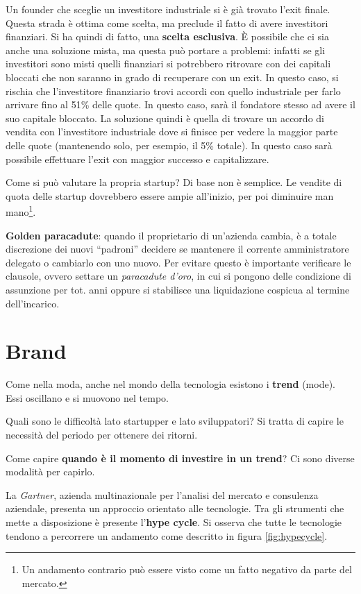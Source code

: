 Un founder che sceglie un investitore industriale si è già trovato l'exit
finale.
Questa strada è ottima come scelta, ma preclude il fatto di avere investitori
finanziari. Si ha quindi di fatto, una \textbf{scelta esclusiva}.
È possibile che ci sia anche una soluzione mista, ma questa può portare a
problemi: infatti se gli investitori sono misti quelli finanziari si potrebbero
ritrovare con dei capitali bloccati che non saranno in grado di recuperare con
un exit. In questo caso, si rischia che l'investitore finanziario trovi accordi
con quello industriale per farlo arrivare fino al 51\% delle quote. In questo
caso, sarà il fondatore stesso ad avere il suo capitale bloccato. La soluzione
quindi è quella di trovare un accordo di vendita con l'investitore industriale
dove si finisce per vedere la maggior parte delle quote (mantenendo solo, per
esempio, il 5\% totale). In questo caso sarà possibile effettuare l'exit con
maggior successo e capitalizzare.

Come si può valutare la propria startup? Di base non è semplice. Le vendite di
quota delle startup dovrebbero essere ampie all'inizio, per poi diminuire man
mano\footnote{Un andamento contrario può essere visto come un fatto negativo da
parte del mercato.}.

\textbf{Golden paracadute}: quando il proprietario di un'azienda cambia, è a
totale discrezione dei nuovi ``padroni'' decidere se mantenere il corrente
amministratore delegato o cambiarlo con uno nuovo. Per evitare questo è
importante verificare le clausole, ovvero settare un \textit{paracadute d'oro},
in cui si pongono delle condizione di assunzione per tot. anni oppure si
stabilisce una liquidazione cospicua al termine dell'incarico.

\chapter{Brand}

Come nella moda, anche nel mondo della tecnologia esistono i \textbf{trend}
(mode). Essi oscillano e si muovono nel tempo.

Quali sono le difficoltà lato startupper e lato sviluppatori? Si tratta di
capire le necessità del periodo per ottenere dei ritorni.

Come capire \textbf{quando è il momento di investire in un trend}?
Ci sono diverse modalità per capirlo.

La \textit{Gartner}, azienda multinazionale per l'analisi del mercato e
consulenza aziendale, presenta un approccio orientato alle tecnologie. Tra gli
strumenti che mette a disposizione è presente l'\textbf{hype cycle}.
Si osserva che tutte le tecnologie tendono a percorrere un andamento come
descritto in figura \ref{fig:hypecycle}.

